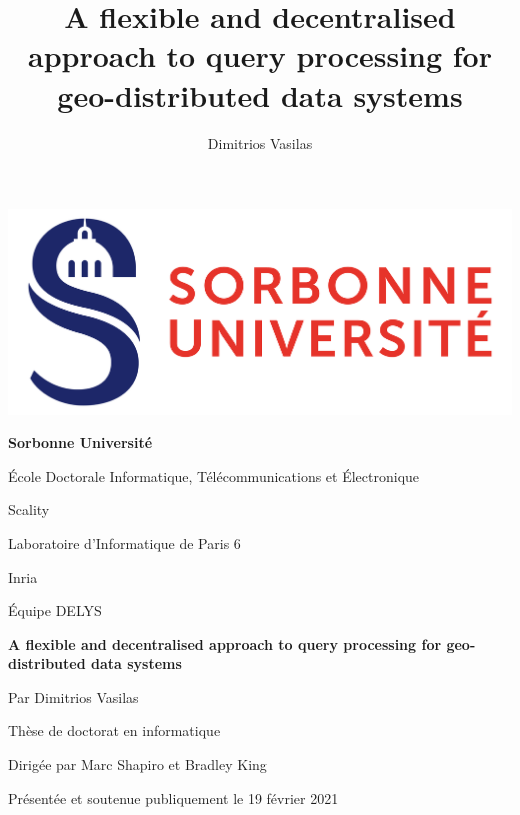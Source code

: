\documentclass[a4paper,usenames,dvipsnames]{report}
\title{A flexible and decentralised approach to query processing for geo-distributed data systems}
\author{Dimitrios Vasilas}
\date{}
\newcommand\blankpage{%
    \null
    \thispagestyle{empty}%
    \addtocounter{page}{-1}%
    \newpage}
\begin{document}

\afterpage{\blankpage}

\thispagestyle{empty}


\includegraphics[scale=.08]{./figures/Logo_Sorbonne_Universite.png}
\vspace*{1.5cm}
\begin{center}
  {\Huge{\bf Sorbonne Universit\'e}}

  \vspace*{1cm}

  {\Large\'Ecole Doctorale Informatique, T\'el\'ecommunications et \'Electronique}

  \vspace*{0.3cm}

  {\Large Scality}

  \vspace*{0.3cm}

  {\Large Laboratoire d’Informatique de Paris 6}

  \vspace*{0.3cm}

  {\Large Inria}

  \vspace*{0.3cm}

  {\Large \'Equipe DELYS}

  \vspace*{1cm}

  {\LARGE {\bf A flexible and decentralised approach to query processing for geo-distributed data systems}}

  \vspace*{1.5cm}

  {\Large Par Dimitrios Vasilas}

  \vspace*{1cm}

  {\Large Th\`ese de doctorat en informatique}

  \vspace*{1cm}

  {\Large Dirig\'ee par Marc Shapiro et Bradley King}

  \vspace*{1cm}

  {\large Pr\'esent\'ee et soutenue publiquement le 19 f\'evrier 2021}
\end{center}
\end{document}

